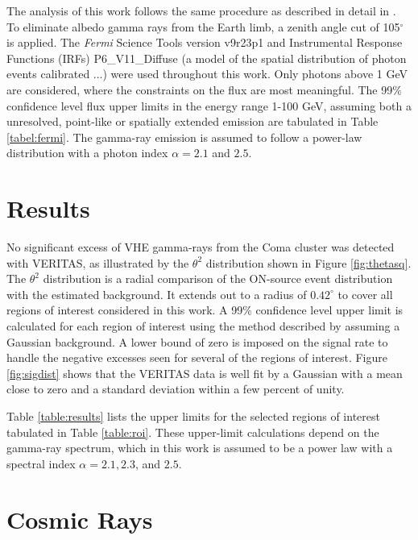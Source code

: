 \documentclass[12pt,manuscript]{aastex}
\begin{document}
The analysis of this work follows the same procedure as described in detail in \citet{article:Abdo_etal:2009}. To eliminate albedo gamma rays from the Earth limb, a zenith angle cut of 105$^{\circ}$ is applied. The \emph{Fermi} Science Tools version v9r23p1 and Instrumental Response Functions (IRFs) P6\_V11\_Diffuse (a model of the spatial distribution of photon events calibrated ...) were used throughout this work. Only photons above 1 GeV are considered, where the constraints on the flux are most meaningful. The 99\% confidence level flux upper limits in the energy range 1-100 GeV, assuming both a unresolved, point-like or spatially extended emission are tabulated in Table \ref{tabel:fermi}. The gamma-ray emission is assumed to follow a power-law distribution with a photon index $\alpha=2.1$ and $2.5$.

\section{Results}
No significant excess of VHE gamma-rays from the Coma cluster was detected with VERITAS, as illustrated by the $\theta^{2}$ distribution shown in  Figure \ref{fig:thetasq}. The $\theta^{2}$ distribution is a radial comparison of the ON-source event distribution with the estimated background. It extends out to a radius of $0.42^{\circ}$ to cover all regions of interest considered in this work. A 99\% confidence level upper limit is calculated for each region of interest using the method described by \citet{article:Rolke_etal:2005} assuming a Gaussian background. A lower bound of zero is imposed on the signal rate to handle the negative excesses seen for several of the regions of interest. Figure \ref{fig:sigdist} shows that the VERITAS data is well fit by a Gaussian with a mean close to zero and a standard deviation within a few percent of unity. 

Table \ref{table:results} lists the upper limits for the selected regions of interest tabulated in Table \ref{table:roi}. These upper-limit calculations depend on the gamma-ray spectrum, which in this work is assumed to be a power law with a spectral index $\alpha=2.1, 2.3$, and $2.5$.



\section{Cosmic Rays}
\end{document}
